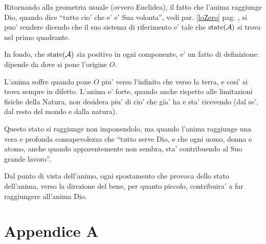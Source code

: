 
Ritornando alla geometria usuale (ovvero Euclidea), il fatto che l'anima raggiunge Dio, quando dice ``tutto cio' che e' e' Sua volonta'', vedi par. \ref{loZero} pag. \pageref{loZero}, si puo' rendere dicendo che il suo sistema di riferimento e' tale che $\textrm{state}(\mathcal{A})$ si trova nel primo quadrante. 

In fondo, che $\textrm{state}(\mathcal{A})$ sia positivo in ogni componente, e' un fatto di definizione: dipende da dove si pone l'origine $O$.

L'anima soffre quando pone $O$ piu' verso l'infinito che verso la terra, e cosi' si trova sempre in difetto. L'anima e' forte, quando anche rispetto alle limitazioni fisiche della Natura, non desidera piu' di cio' che gia' ha e sta' ricevendo (dal se', dal resto del mondo e dalla natura).

Questo stato si raggiunge non imponendolo, ma quando l'anima raggiunge una vera e profonda consapevolezza che ``tutto serve Dio, e che ogni uomo, donna e atomo, anche quando apparentemente non sembra, sta' contribuendo al Suo grande lavoro''.

Dal punto di vista dell'animo, ogni spostamento che provoca dello stato dell'anima, verso la direzione del bene, per quanto piccolo, contribuira' a far raggiungere all'anima Dio.

\section{Appendice A}
\label{menteCrea}

